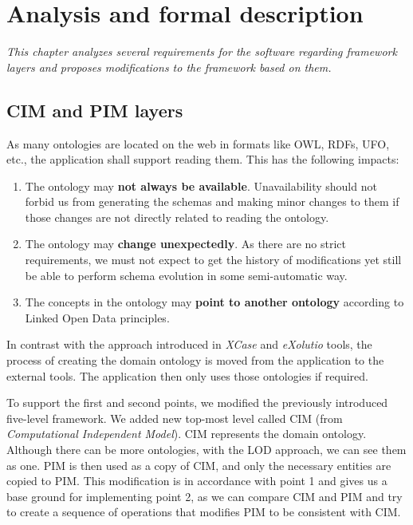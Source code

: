 \chapter{Analysis and formal description}
\label{chapters:analysis}

\textit{This chapter analyzes several requirements for the software regarding framework layers and proposes modifications to the framework based on them.}





\section{CIM and PIM layers}

\begin{requirement}
    \label{requirement:ontologies-on-the-web}
    As many ontologies are located on the web in formats like OWL, RDFs, UFO, etc., the application shall support reading them. This has the following impacts:
    \begin{enumerate}
        \item The ontology may \textbf{not always be available}. Unavailability should not forbid us from generating the schemas and making minor changes to them if those changes are not directly related to reading the ontology.
        \item The ontology may \textbf{change unexpectedly}. As there are no strict requirements, we must not expect to get the history of modifications yet still be able to perform schema evolution in some semi-automatic way.
        \item The concepts in the ontology may \textbf{point to another ontology} according to Linked Open Data principles.
    \end{enumerate}
\end{requirement}

In contrast with the approach introduced in \textit{XCase} and \textit{eXolutio} tools, the process of creating the domain ontology is moved from the application to the external tools. The application then only uses those ontologies if required.

To support the first and second points, we modified the previously introduced five-level framework. We added new top-most level called CIM (from \textit{Computational Independent Model}). CIM represents the domain ontology. Although there can be more ontologies, with the LOD approach, we can see them as one. PIM is then used as a copy of CIM, and only the necessary entities are copied to PIM. This modification is in accordance with point 1 and gives us a base ground for implementing point 2, as we can compare CIM and PIM and try to create a sequence of operations that modifies PIM to be consistent with CIM.

